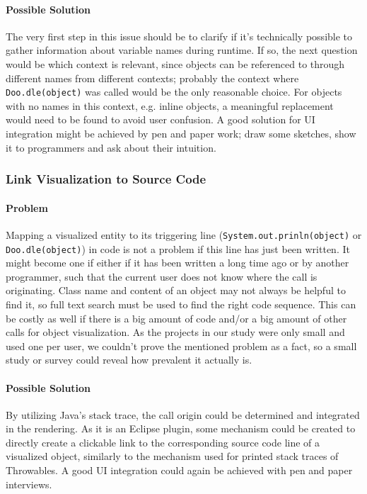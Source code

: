 \documentclass[english]{acm_proc_article-sp}
\begin{document}
\paragraph{Possible Solution}
The very first step in this issue should be to clarify if it's technically possible to gather information about variable names during runtime. If so, the next question would be which context is relevant, since objects can be referenced to through different names from different contexts; probably the context where \verb-Doo.dle(object)- was called would be the only reasonable choice. For objects with no names in this context, e.g. inline objects, a meaningful replacement would need to be found to avoid user confusion. A good solution for UI integration might be achieved by pen and paper work; draw some sketches, show it to programmers and ask about their intuition.

\subsubsection{Link Visualization to Source Code}
\paragraph{Problem}
Mapping a visualized entity to its triggering line (\verb-System.out.prinln(object)- or \verb-Doo.dle(object)-) in code is not a problem if this line has just been written. It might become one if either if it has been written a long time ago or by another programmer, such that the current user does not know where the call is originating. Class name and content of an object may not always be helpful to find it, so full text search must be used to find the right code sequence. This can be costly as well if there is a big amount of code and/or a big amount of other calls for object visualization. As the projects in our study were only small and used one per user, we couldn't prove the mentioned problem as a fact, so a small study or survey could reveal how prevalent it actually is.

\paragraph{Possible Solution}
By utilizing Java's stack trace, the call origin could be determined and integrated in the rendering. As it is an Eclipse plugin, some mechanism could be created to directly create a clickable link to the corresponding source code line of a visualized object, similarly to the mechanism used for printed stack traces of Throwables. A good UI integration could again be achieved with pen and paper interviews.
\end{document}
